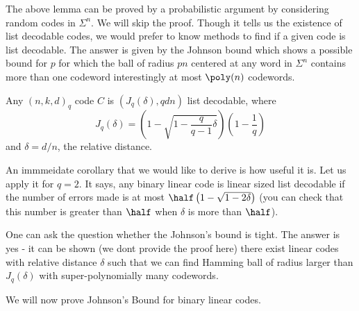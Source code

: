 The above lemma can be proved by a probabilistic argument by considering random codes in $\Sigma^n$. We will skip the proof. 
Though it tells us the existence of list decodable codes, we would prefer to know methods to find if a given code is list decodable. The answer is given by the Johnson bound which shows a possible bound for $p$ for which the ball of radius $pn$ centered at any word in $\Sigma^n$ contains more than one codeword interestingly at most $\poly(n)$ codewords.

\begin{theorem}
Any $(n,k,d)_q$ code $C$ is $(J_q(\delta),qdn)$ list decodable, where
\[ J_q(\delta)= \left( 1-\sqrt{1-\frac{q}{q-1}\delta}\right)(1-\frac{1}{q})\]
and $\delta=d/n$, the relative distance.
\end{theorem}

An immmeidate corollary that we would like to derive is how useful it is. Let us apply it for $q=2$. It says, any binary linear code is linear sized list decodable if the number of errors made is at most $\half\left( 1-\sqrt{1-2\delta}\right)$ (you can check that this number is greater than $\half$ when $\delta$ is more than $\half$). 

One can ask the question whether the Johnson's bound is tight. The answer is yes - it can be shown (we dont provide the proof here) there exist linear codes with relative distance $\delta$ such
that we can find Hamming ball of radius larger than $J_q(\delta)$ with super-polynomially many codewords.

We will now prove Johnson's Bound for binary linear codes.

